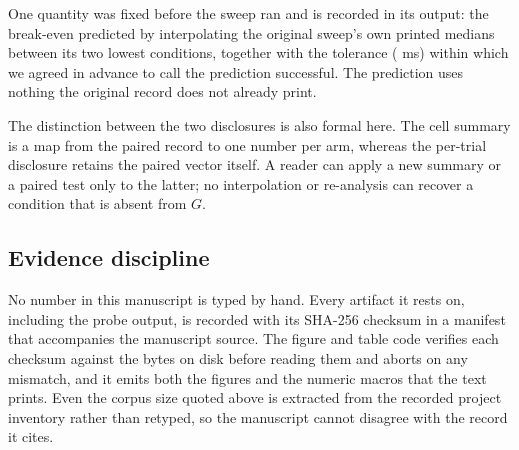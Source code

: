 One quantity was fixed before the sweep ran and is recorded in its output: the
break-even predicted by interpolating the original sweep's own printed medians
between its two lowest conditions, together with the tolerance
(\PredictionTolerance{} ms) within which we agreed in advance to call the
prediction successful. The prediction uses nothing the original record does not
already print.

The distinction between the two disclosures is also formal here. The cell
summary is a map from the paired record to one number per arm, whereas the
per-trial disclosure retains the paired vector itself. A reader can apply a new
summary or a paired test only to the latter; no interpolation or re-analysis can
recover a condition that is absent from $G$.

\subsection{Evidence discipline}

No number in this manuscript is typed by hand. Every artifact it rests on,
including the probe output, is recorded with its SHA-256 checksum in a manifest
that accompanies the manuscript source. The figure and table code verifies each
checksum against the bytes on disk before reading them and aborts on any mismatch,
and it emits both the figures and the numeric macros that the text prints. Even
the corpus size quoted above is extracted from the recorded project inventory rather
than retyped, so the manuscript cannot disagree with the record it cites.
